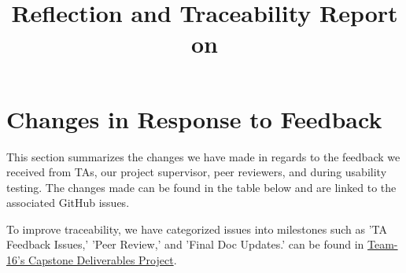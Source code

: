 \documentclass{article}
\title{Reflection and Traceability Report on \progname}
\author{\authname}
\date{}
\begin{document}
\maketitle


\section{Changes in Response to Feedback}

This section summarizes the changes we have made in regards to the feedback we received from TAs, our project supervisor, peer reviewers, and during usability testing. The changes made can be found in the table below and are linked to the associated GitHub issues.

To improve traceability, we have categorized issues into milestones such as 'TA Feedback Issues,' 'Peer Review,' and 'Final Doc Updates.' can be found in \href{https://github.com/harrisonchiu/xray}{Team-16's Capstone Deliverables Project}.
\end{document}
